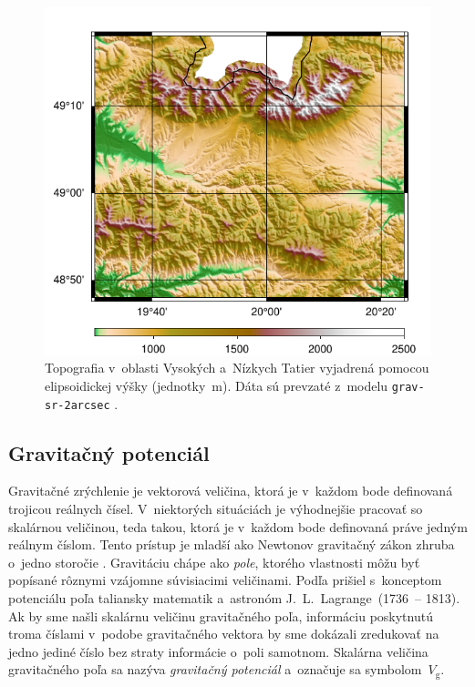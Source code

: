 \documentclass[a4paper, 12pt]{book}
\newcommand{\gidx}{\mathrm g}
\begin{document}
\begin{figure}
\centering
\includegraphics{./fig-h-grav-sr-2arcsec.pdf}
\caption{Topografia v~oblasti Vysokých a~Nízkych Tatier vyjadrená pomocou 
elipsoidickej výšky (jednotky~m).  Dáta sú prevzaté z~modelu 
\texttt{grav-sr-2arcsec} \parencite{GravSR2arcsec}.}
\label{fig:h_grav_sr_2arcsec}
\end{figure}







\subsection{Gravitačný potenciál}
\label{sec:vg}

Gravitačné zrýchlenie je vektorová veličina, ktorá je v~každom bode definovaná 
trojicou reálnych čísel.  V~niektorých situáciách je výhodnejšie pracovať so 
skalárnou veličinou, teda takou, ktorá je v~každom bode definovaná práve jedným 
reálnym číslom.  Tento prístup je mladší ako Newtonov gravitačný zákon zhruba 
o~jedno storočie \parencite{MacMillan1930,Jekeli2015}.  Gravitáciu chápe ako 
\emph{pole}, ktorého vlastnosti môžu byť popísané rôznymi vzájomne súvisiacimi 
veličinami.  Podľa \textcite{MacMillan1930} prišiel s~konceptom potenciálu poľa 
taliansky matematik a~astronóm J.~L.~Lagrange~(1736~-- 1813).  Ak by sme našli 
skalárnu veličinu gravitačného poľa, informáciu poskytnutú troma číslami 
v~podobe gravitačného vektora by sme dokázali zredukovať na jedno jediné číslo 
bez straty informácie o~poli samotnom.  Skalárna veličina gravitačného poľa sa 
nazýva \emph{gravitačný potenciál} a~označuje sa symbolom~$V_\gidx$.
\end{document}
